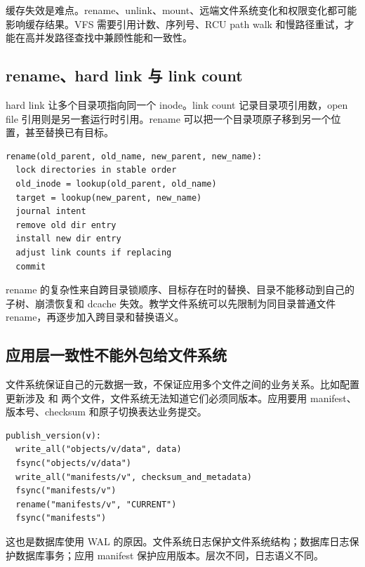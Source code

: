 缓存失效是难点。rename、unlink、mount、远端文件系统变化和权限变化都可能影响缓存结果。VFS 需要引用计数、序列号、RCU path walk 和慢路径重试，才能在高并发路径查找中兼顾性能和一致性。

\subsection{rename、hard link 与 link count}

hard link 让多个目录项指向同一个 inode。link count 记录目录项引用数，open file 引用则是另一套运行时引用。rename 可以把一个目录项原子移到另一个位置，甚至替换已有目标。

\begin{lstlisting}
rename(old_parent, old_name, new_parent, new_name):
  lock directories in stable order
  old_inode = lookup(old_parent, old_name)
  target = lookup(new_parent, new_name)
  journal intent
  remove old dir entry
  install new dir entry
  adjust link counts if replacing
  commit
\end{lstlisting}

rename 的复杂性来自跨目录锁顺序、目标存在时的替换、目录不能移动到自己的子树、崩溃恢复和 dcache 失效。教学文件系统可以先限制为同目录普通文件 rename，再逐步加入跨目录和替换语义。

\subsection{应用层一致性不能外包给文件系统}

文件系统保证自己的元数据一致，不保证应用多个文件之间的业务关系。比如配置更新涉及  和  两个文件，文件系统无法知道它们必须同版本。应用要用 manifest、版本号、checksum 和原子切换表达业务提交。

\begin{lstlisting}
publish_version(v):
  write_all("objects/v/data", data)
  fsync("objects/v/data")
  write_all("manifests/v", checksum_and_metadata)
  fsync("manifests/v")
  rename("manifests/v", "CURRENT")
  fsync("manifests")
\end{lstlisting}

这也是数据库使用 WAL 的原因。文件系统日志保护文件系统结构；数据库日志保护数据库事务；应用 manifest 保护应用版本。层次不同，日志语义不同。
